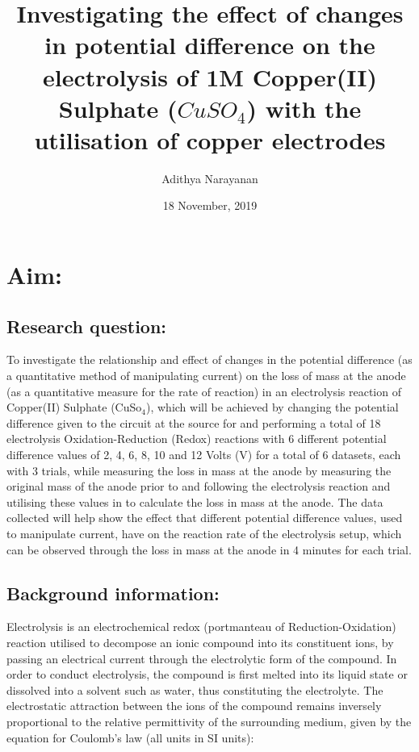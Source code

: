 \documentclass[11pt, a4]{article}
\title{\vspace{90mm}Investigating the effect of changes in potential difference on the electrolysis of 1M Copper(II) Sulphate ($ CuSO_{4} $) with the utilisation of copper electrodes}
\author{Adithya Narayanan}
\date{18 November, 2019}
\begin{document}
	\begin{titlepage}
		\maketitle
		\thispagestyle{empty}
	\end{titlepage}
	\tableofcontents
	\thispagestyle{empty}
	\newpage
	\clearpage
	\setcounter{page}{1}
	\section{Aim:}
		\subsection{Research question:}
			To investigate the relationship and effect of changes in the potential difference (as a quantitative method of manipulating current) on the loss of mass at the anode (as a quantitative measure for the rate of reaction) in an electrolysis reaction of Copper(II) Sulphate (CuSo$_{4}$), which will be achieved by changing the potential difference given to the circuit at the source for and performing a total of 18 electrolysis Oxidation-Reduction (Redox) reactions with 6 different potential difference values of 2, 4, 6, 8, 10 and 12 Volts (V) for a total of 6 datasets, each with 3 trials, while measuring the loss in mass at the anode by measuring the original mass of the anode prior to and following the electrolysis reaction and utilising these values in to calculate the loss in mass at the anode. The data collected will help show the effect that different potential difference values, used to manipulate current, have on the reaction rate of the electrolysis setup, which can be observed through the loss in mass at the anode in 4 minutes for each trial.
			
		\subsection{Background information:}
			Electrolysis is an electrochemical redox (portmanteau of Reduction-Oxidation) reaction utilised to decompose an ionic compound into its constituent ions, by passing an electrical current through the electrolytic form of the compound. In order to conduct electrolysis, the compound is first melted into its liquid state or dissolved into a solvent such as water, thus constituting the electrolyte. The electrostatic attraction between the ions of the compound remains inversely proportional to the relative permittivity of the surrounding medium, given by the equation for Coulomb's law (all units in SI units):
			
\end{document}
